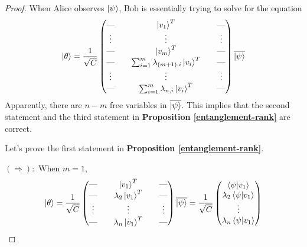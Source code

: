 \begin{proof}
When Alice observes $\ket{\psi}$, Bob is essentially trying to solve for the equation\\
\begin{equation}
\ket{\theta}= \frac{1}{\sqrt{C}}\begin{pmatrix}
\text{---} && \ket{v_1}^T &&\text{---} \\
\vdots && \vdots && \vdots\\
\text{---} && \ket{v_m}^T && \text{---} \\
\text{---} && \sum_{i=1}^m \lambda_{(m+1), i}\ket{v_i}^T  &&\text{---} \\
\vdots && \vdots && \vdots \\
\text{---} && \sum_{i=1}^m \lambda_{n, i}\ket{v_i}^T &&\text{---} \\
\end{pmatrix}\overline{\ket{\psi}}  
\end{equation}
Apparently, there are $n-m$ free variables in $\overline{\ket{\psi}}$. This implies that the second statement and the third statement in \textbf{Proposition \ref{entanglement-rank}} are correct.

\bigskip
Let's prove the first statement in \textbf{Proposition \ref{entanglement-rank}}.

$(\Rightarrow):$ When $m=1$, 
\begin{equation}
\ket{\theta}=\frac{1}{\sqrt{C}}\begin{pmatrix}
\text{---} && \ket{v_1}^T &&\text{---} \\
\text{---} && \lambda_2\ket{v_1}^T &&\text{---} \\
\vdots && \vdots && \vdots\\
\text{---} && \lambda_n\ket{v_1}^T &&\text{---} \\
\end{pmatrix}
\overline{\ket{\psi}}\\
=\frac{1}{\sqrt{C}}\begin{pmatrix}
\braket{\psi|v_1}\\
\lambda_2 \braket{\psi|v_1}\\
\vdots\\
\lambda_n \braket{\psi|v_1}
\end{pmatrix}
\end{equation}


\end{proof}
